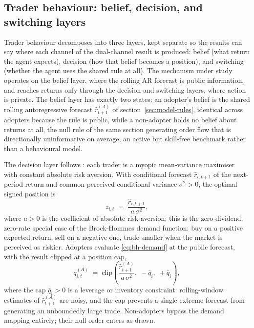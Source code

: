 \documentclass[12pt]{article}
\begin{document}
\subsection{Trader behaviour: belief, decision, and switching layers}\label{sec:model-traders}

Trader behaviour decomposes into three layers, kept separate so the results can say where each channel of the dual-channel result is produced: belief (what return the agent expects), decision (how that belief becomes a position), and switching (whether the agent uses the shared rule at all). The mechanism under study operates on the belief layer, where the rolling AR forecast is public information, and reaches returns only through the decision and switching layers, where action is private. The belief layer has exactly two states: an adopter's belief is the shared rolling autoregressive forecast $\hat{r}_{t+1}^{(A)}$ of section~\ref{sec:model-rules}, identical across adopters because the rule is public, while a non-adopter holds no belief about returns at all, the null rule of the same section generating order flow that is directionally uninformative on average, an active but skill-free benchmark rather than a behavioural model. %

The decision layer follows \citet{brockhommes1998}: each trader is a myopic mean-variance maximiser with constant absolute risk aversion. With conditional forecast $\hat{r}_{i,t+1}$ of the next-period return and common perceived conditional variance $\sigma^{2} > 0$, the optimal signed position is %
\begin{equation}
  z_{i,t} \;=\; \frac{\hat{r}_{i,t+1}}{a\, \sigma^{2}},
  \label{eq:bh-demand}
\end{equation}
where $a > 0$ is the coefficient of absolute risk aversion; this is the zero-dividend, zero-rate special case of the Brock-Hommes demand function: buy on a positive expected return, sell on a negative one, trade smaller when the market is perceived as riskier. Adopters evaluate \eqref{eq:bh-demand} at the public forecast, with the result clipped at a position cap, %
\begin{equation}
  q_{i,t}^{(A)} \;=\; \mathrm{clip}\!\left(\frac{\hat{r}_{t+1}^{(A)}}{a\, \sigma^{2}},\; -\bar{q}_{i},\; +\bar{q}_{i}\right),
  \label{eq:advanced-order}
\end{equation}
where the cap $\bar{q}_{i} > 0$ is a leverage or inventory constraint: rolling-window estimates of $\hat{r}_{t+1}^{(A)}$ are noisy, and the cap prevents a single extreme forecast from generating an unboundedly large trade. Non-adopters bypass the demand mapping entirely; their null order enters as drawn. %
\end{document}

